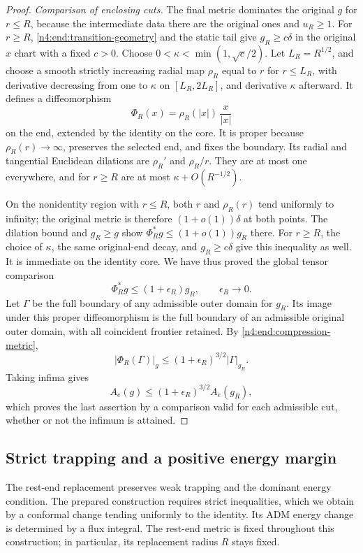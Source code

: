 \begin{proof}
\smallskip
\noindent\emph{Comparison of enclosing cuts.} The final metric dominates the original \(g\) for \(r\le R\), because
the intermediate data there are the original ones and \(u_R\ge1\).
For \(r\ge R\), \eqref{n4:end:transition-geometry} and the static tail
give \(g_R\ge c\delta\) in the original \(x\) chart with a fixed
\(c>0\). Choose \(0<\kappa<\min(1,\sqrt c/2)\).
Let \(L_R=R^{1/2}\), and choose a smooth strictly increasing radial map
\(\rho_R\) equal to \(r\) for \(r\le L_R\), with derivative decreasing
from one to \(\kappa\) on \([L_R,2L_R]\), and derivative \(\kappa\)
afterward. It defines a diffeomorphism
\[
 \Phi_R(x)=\rho_R(|x|)\,\frac{x}{|x|}
\]
on the end, extended by the identity on the core. It is proper because
\(\rho_R(r)\to\infty\), preserves the selected end, and fixes the
boundary. Its radial and tangential Euclidean dilations are
\(\rho_R'\) and \(\rho_R/r\). They are at most one everywhere, and
for \(r\ge R\) are at most \(\kappa+O(R^{-1/2})\).

On the nonidentity region with \(r\le R\), both \(r\) and
\(\rho_R(r)\) tend uniformly to infinity; the original metric is
therefore \((1+o(1))\delta\) at both points. The dilation bound and
\(g_R\ge g\) show
\(\Phi_R^*g\le(1+o(1))g_R\) there. For \(r\ge R\), the choice
of \(\kappa\), the same original-end decay, and \(g_R\ge c\delta\)
give this inequality as well. It is immediate on the identity core.
We have thus proved the global tensor comparison
\begin{equation}\label{n4:end:compression-metric}
 \Phi_R^*g\le(1+\epsilon_R)g_R,\qquad\epsilon_R\longrightarrow0.
\end{equation}
Let \(\Gamma\) be the full boundary of any admissible outer domain
for \(g_R\). Its image under this proper diffeomorphism is the full
boundary of an admissible original outer domain, with all coincident
frontier retained. By \eqref{n4:end:compression-metric},
\[
 |\Phi_R(\Gamma)|_g
 \le(1+\epsilon_R)^{3/2}|\Gamma|_{g_R}.
\]
Taking infima gives
\[
 A_e(g)\le(1+\epsilon_R)^{3/2}A_e(g_R),
\]
which proves the last assertion by a comparison valid for each
admissible cut, whether or not the infimum is attained.
\end{proof}

\subsection{Strict trapping and a positive energy margin}
\label{n4:sec:strictification}

The rest-end replacement preserves weak trapping and the dominant energy
condition. The prepared construction requires strict inequalities, which
we obtain by a conformal change tending uniformly to the identity. Its
ADM energy change is determined by a flux integral. The rest-end metric
is fixed throughout this construction; in particular, its replacement
radius \(R\) stays fixed.

